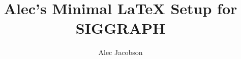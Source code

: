 \documentclass[acmtog,nonacm,timestamp,review]{acmart}
\begin{document}
\title{Alec's Minimal LaTeX Setup for SIGGRAPH}

\author{Alec Jacobson}

\begin{abstract}
\end{abstract}


\maketitle

\layoutdetails



\end{document}
